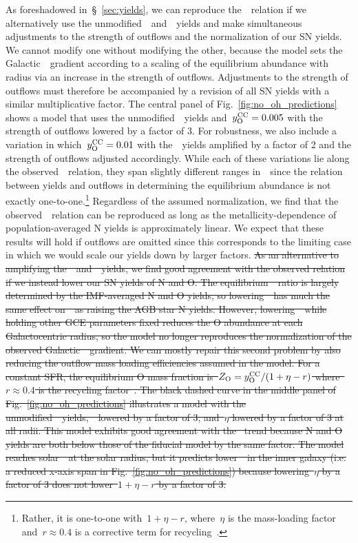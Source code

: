 \documentclass[ms.tex]{subfiles}
\begin{document}
{\color{red}
As foreshadowed in~\S~\ref{sec:yields}, we can reproduce the~\ohno~relation if
we alternatively use the unmodified~\cristallo~and~\ventura~yields and make
simultaneous adjustments to the strength of outflows and the normalization of
our SN yields.
We cannot modify one without modifying the other, because the
\citet{Johnson2021} model sets the Galactic~\oh~gradient according to a scaling
of the equilibrium abundance with radius via an increase in the strength of
outflows.
Adjustments to the strength of outflows must therefore be accompanied by a
revision of all SN yields with a similar multiplicative factor.
The central panel of Fig.~\ref{fig:no_oh_predictions} shows a model that uses
the unmodified~\cristallo~yields and~$y_\text{O}^\text{CC} = 0.005$ with the strength of
outflows lowered by a factor of 3.
For robustness, we also include a variation in which~$y_\text{O}^\text{CC} = 0.01$ with
the~\cristallo~yields amplified by a factor of 2 and the strength of outflows
adjusted accordingly.
While each of these variations lie along the observed~\ohno~relation, they span
slightly different ranges in~\oh~since the relation between yields and outflows
in determining the equilibrium abundance is not exactly one-to-one.\footnote{
	\color{red}
	Rather, it is one-to-one with~$1 + \eta - r$, where~$\eta$ is the
	mass-loading factor and~$r \approx 0.4$ is a corrective term for
	recycling~\citep{Weinberg2017}.
}
Regardless of the assumed normalization, we find that the
observed~\ohno~relation can be reproduced as long as the
metallicity-dependence of population-averaged N yields is approximately linear.
We expect that these results will hold if outflows are omitted since this
corresponds to the limiting case in which we would scale our yields down by
larger factors.
\sout{
As an alternative to amplifying the~\cristallo~and~\ventura~yields, we find
good agreement with the observed relation if we instead lower our SN yields
of N and O.
The equilibrium~\no~ratio is largely determined by the IMF-averaged N and O
yields, so lowering~~has much the same effect on~\no~as raising the AGB
star N yields.
However, lowering~~while holding other GCE parameters fixed reduces the
O abundance at each Galactocentric radius, so the model no longer reproduces
the normalization of the observed Galactic~\oh~gradient.
We can mostly repair this second problem by also reducing the outflow mass
loading efficiencies assumed in the model.
For a constant SFR, the equilibrium O mass fraction
is~$Z_\text{O} = y_\text{O}^\text{CC}/(1 + \eta - r)$ where~$r \approx 0.4$ is the recycling
factor~\mbox{\citep{Weinberg2017}}.
The black dashed curve in the middle panel of Fig.~\ref{fig:no_oh_predictions}
illustrates a model with the unmodified~\cristallo~yields,~~lowered by a
factor of 3, and~$\eta$ lowered by a factor of 3 at all radii.
This model exhibits good agreement with the~\mbox{\citet{Dopita2016}} trend
because N
and O yields are both below those of the fiducial model by the same factor.
The model reaches solar~\oh~at the solar radius, but it predicts lower~\oh~in
the inner galaxy (i.e. a reduced x-axis span in
Fig.~\ref{fig:no_oh_predictions}) because lowering~$\eta$ by a factor of 3 does
not lower~$1 + \eta - r$ by a factor of 3.
}
}
\end{document}
